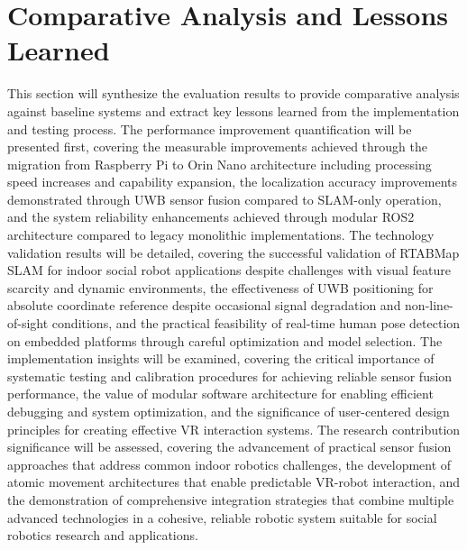 \section{Comparative Analysis and Lessons Learned}
This section will synthesize the evaluation results to provide comparative analysis against baseline systems and extract key lessons learned from the implementation and testing process. The performance improvement quantification will be presented first, covering the measurable improvements achieved through the migration from Raspberry Pi to Orin Nano architecture including processing speed increases and capability expansion, the localization accuracy improvements demonstrated through UWB sensor fusion compared to SLAM-only operation, and the system reliability enhancements achieved through modular ROS2 architecture compared to legacy monolithic implementations. The technology validation results will be detailed, covering the successful validation of RTABMap SLAM for indoor social robot applications despite challenges with visual feature scarcity and dynamic environments, the effectiveness of UWB positioning for absolute coordinate reference despite occasional signal degradation and non-line-of-sight conditions, and the practical feasibility of real-time human pose detection on embedded platforms through careful optimization and model selection. The implementation insights will be examined, covering the critical importance of systematic testing and calibration procedures for achieving reliable sensor fusion performance, the value of modular software architecture for enabling efficient debugging and system optimization, and the significance of user-centered design principles for creating effective VR interaction systems. The research contribution significance will be assessed, covering the advancement of practical sensor fusion approaches that address common indoor robotics challenges, the development of atomic movement architectures that enable predictable VR-robot interaction, and the demonstration of comprehensive integration strategies that combine multiple advanced technologies in a cohesive, reliable robotic system suitable for social robotics research and applications.

